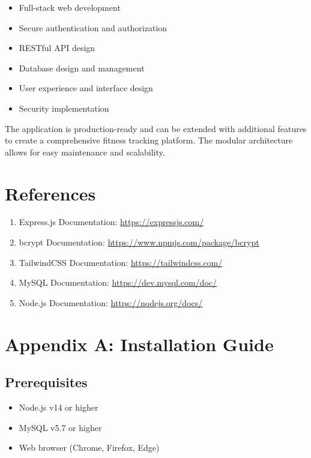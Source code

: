 \documentclass[12pt,a4paper]{article}
\begin{document}
\begin{itemize}
    \item Full-stack web development
    \item Secure authentication and authorization
    \item RESTful API design
    \item Database design and management
    \item User experience and interface design
    \item Security implementation
\end{itemize}

The application is production-ready and can be extended with additional features to create a comprehensive fitness tracking platform. The modular architecture allows for easy maintenance and scalability.

\section{References}

\begin{enumerate}
    \item Express.js Documentation: \url{https://expressjs.com/}
    \item bcrypt Documentation: \url{https://www.npmjs.com/package/bcrypt}
    \item TailwindCSS Documentation: \url{https://tailwindcss.com/}
    \item MySQL Documentation: \url{https://dev.mysql.com/doc/}
    \item Node.js Documentation: \url{https://nodejs.org/docs/}
\end{enumerate}

\appendix
\section{Appendix A: Installation Guide}

\subsection{Prerequisites}
\begin{itemize}
    \item Node.js v14 or higher
    \item MySQL v5.7 or higher
    \item Web browser (Chrome, Firefox, Edge)
\end{itemize}
\end{document}
